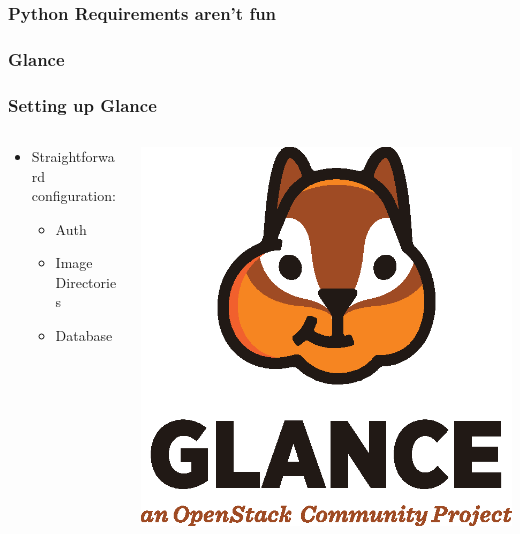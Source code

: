 \documentclass[aspectratio=169,11pt,hyperref={colorlinks=true}]{beamer}
\begin{document}
\begin{frame}
    \frametitle{Python Requirements aren't fun}
    
\end{frame}

\subsubsection{Glance}
\begin{frame}
    \frametitle{Setting up Glance}
    \begin{columns}[T]
        \begin{column}{.48\textwidth}
            \begin{itemize}
                \item Straightforward configuration:
                    \begin{itemize}
                        \item Auth
                        \item Image Directories
                        \item Database
                    \end{itemize}
            \end{itemize}
        \end{column}
        \begin{column}{.48\textwidth}
            \includegraphics[width=\textwidth]{mascots/glance.eps}
        \end{column}
    \end{columns}
\end{frame}
\end{document}
